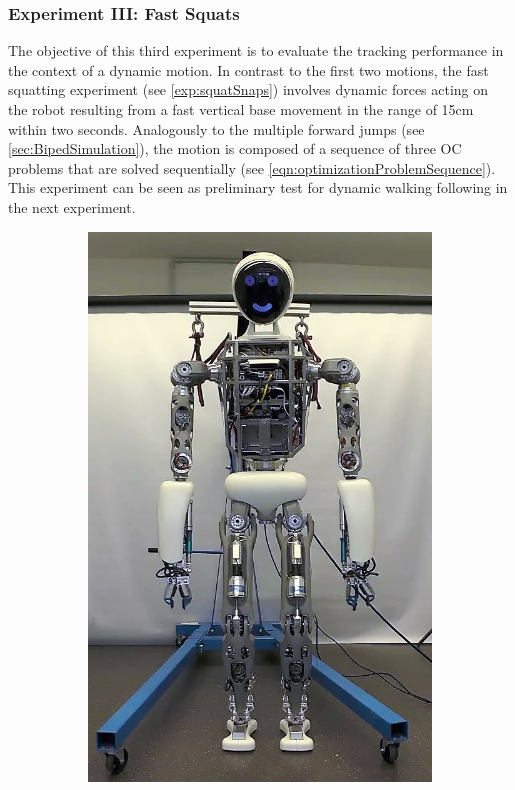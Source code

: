 \subsubsection{Experiment III: Fast Squats}
The objective of this third experiment is to evaluate the tracking performance in the context of a dynamic motion. In contrast to the first two motions, the fast squatting experiment (see \cref{exp:squatSnaps}) involves dynamic forces acting on the robot resulting from a fast vertical base movement in the range of 15cm within two seconds. Analogously to the multiple forward jumps (see \cref{sec:BipedSimulation}), the motion is composed of a sequence of three \gls{OC} problems that are solved sequentially (see \cref{eqn:optimizationProblemSequence}). This experiment can be seen as preliminary test for dynamic walking following in the next experiment.   
\begin{figure}[h!]
\begin{subfigure}{.14\textwidth}
	\includegraphics[width=.95\linewidth]{experiments/squats/snaps/1}

\end{subfigure}
\end{figure}
